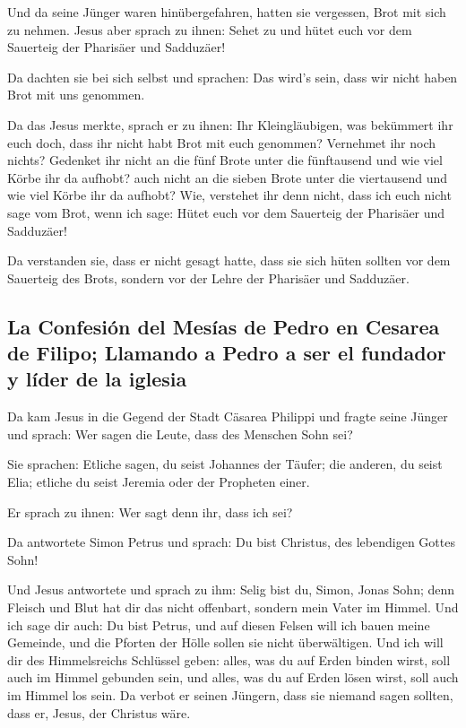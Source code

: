  Und da seine Jünger waren hinübergefahren, hatten sie
vergessen, Brot mit sich zu nehmen.  Jesus aber sprach zu
ihnen: Sehet zu und hütet euch vor dem Sauerteig der Pharisäer und
Sadduzäer!

 Da dachten sie bei sich selbst und sprachen: Das wird's
sein, dass wir nicht haben Brot mit uns genommen.

 Da das Jesus merkte, sprach er zu ihnen: Ihr
Kleingläubigen, was bekümmert ihr euch doch, dass ihr nicht habt Brot
mit euch genommen?  Vernehmet ihr noch nichts? Gedenket
ihr nicht an die fünf Brote unter die fünftausend und wie viel Körbe ihr
da aufhobt?  auch nicht an die sieben Brote unter die
viertausend und wie viel Körbe ihr da aufhobt?  Wie,
verstehet ihr denn nicht, dass ich euch nicht sage vom Brot, wenn ich
sage: Hütet euch vor dem Sauerteig der Pharisäer und Sadduzäer!

 Da verstanden sie, dass er nicht gesagt hatte, dass sie
sich hüten sollten vor dem Sauerteig des Brots, sondern vor der Lehre
der Pharisäer und Sadduzäer.

\hypertarget{la-confesiuxf3n-del-mesuxedas-de-pedro-en-cesarea-de-filipo-llamando-a-pedro-a-ser-el-fundador-y-luxedder-de-la-iglesia}{%
\subsection{La Confesión del Mesías de Pedro en Cesarea de Filipo;
Llamando a Pedro a ser el fundador y líder de la
iglesia}\label{la-confesiuxf3n-del-mesuxedas-de-pedro-en-cesarea-de-filipo-llamando-a-pedro-a-ser-el-fundador-y-luxedder-de-la-iglesia}}

 Da kam Jesus in die Gegend der Stadt Cäsarea Philippi
und fragte seine Jünger und sprach: Wer sagen die Leute, dass des
Menschen Sohn sei?

 Sie sprachen: Etliche sagen, du seist Johannes der
Täufer; die anderen, du seist Elia; etliche du seist Jeremia oder der
Propheten einer.

 Er sprach zu ihnen: Wer sagt denn ihr, dass ich sei?

 Da antwortete Simon Petrus und sprach: Du bist Christus,
des lebendigen Gottes Sohn!

 Und Jesus antwortete und sprach zu ihm: Selig bist du,
Simon, Jonas Sohn; denn Fleisch und Blut hat dir das nicht offenbart,
sondern mein Vater im Himmel.  Und ich sage dir auch: Du
bist Petrus, und auf diesen Felsen will ich bauen meine Gemeinde, und
die Pforten der Hölle sollen sie nicht überwältigen.  Und
ich will dir des Himmelsreichs Schlüssel geben: alles, was du auf Erden
binden wirst, soll auch im Himmel gebunden sein, und alles, was du auf
Erden lösen wirst, soll auch im Himmel los sein.  Da
verbot er seinen Jüngern, dass sie niemand sagen sollten, dass er,
Jesus, der Christus wäre.

